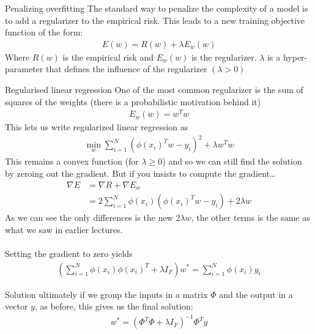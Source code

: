 \begin{parag}{Penalizing overfitting}
    The standard way to penalize the complexity of a model is to add a regularizer to the empirical risk. This leads to a new training objective function of the form:
	\begin{align*} 
		E\left(w\right) = R\left(w\right) + \lambda E_w\left(w\right)
	\end{align*}
		Where $R\left(w\right)$ is the empirical risk and $E_w\left(w\right)$ is the regularizer. $\lambda$ is a hyper-parameter that defines the influence of the regularizer $\left(\lambda > 0\right)$
	\end{parag}
	\begin{parag}{Regularised linear regression}
		One of the most common regularizer is the sum of squares of the weights (there is a probabilistic motivation behind it)
		\begin{align*} 
			E_w\left(w\right) = w^{T}w
		\end{align*}
		This lets us write regularized linear regression as
		\begin{align*} 
			\min_w \sum_{i= 1}^{N}\left(\phi\left(x_i\right)^{T}w - y_i\right)^2 + \lambda w^{T}w
		\end{align*}
		This remains a convex function (for $\lambda \geq 0$) and so we can still find the solution by zeroing out the gradient. But if you insists to compute the gradient\ldots
		\begin{align*} 
			\nabla E &= \nabla R  + \nabla E_w\\
					 &= 2 \sum_{i = 1}^{N}\phi\left(x_i\right)\left(\phi\left(x_i\right)^{T}w - y_i\right) + 2\lambda w
		\end{align*}
		As we can see the only differences is the new $2\lambda w$, the other terms is the same as what we saw in earlier lectures.\\
		$ $\\
		Setting the gradient to zero yields
		\begin{align*} 
			\left(\sum_{i= 1}^{N}\phi\left(x_i\right)\phi\left(x_i\right)^{T} + \lambda I_F\right)w^{\ast} =  \sum_{i= 1}^{N}\phi\left(x_i\right)y_i
		\end{align*}
		\begin{subparag}{Solution}
			ultimately if we group the inputs in a matrix $\Phi$ and the output in a vector $y$, as before, this gives us the final solution:
			\begin{align*} 
				w^{\ast} = \left(\Phi^{T}\Phi + \lambda I_F\right)^{-1} \Phi^{T}y
			\end{align*}

\end{subparag}
\end{parag}

